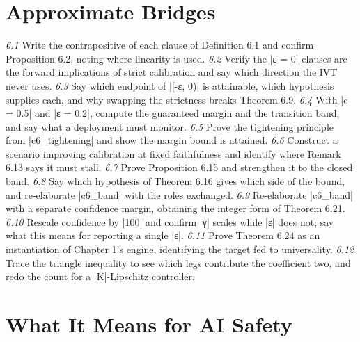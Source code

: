 \documentclass{memoir}
\begin{document}
\section{Approximate Bridges}\label{Two--Schemas--of--Impossibility-005F-005F-005F--Machine--Checked--Limits--of--Trustworthy--Machine--Learning-005F-005F-005F--and--Why--They--Tighten--with--Capability----Exercises----Approximate--Bridges}

\emph{6.1} Write the contrapositive of each clause of Definition 6.1 and confirm
Proposition 6.2, noting where linearity is used.
\emph{6.2} Verify the \LeanVerb|ε = 0| clauses are the forward implications of strict calibration and
say which direction the IVT never uses.
\emph{6.3} Say which endpoint of \LeanVerb|[-ε, 0)| is attainable, which hypothesis supplies each,
and why swapping the strictness breaks Theorem 6.9.
\emph{6.4} With \LeanVerb|c = 0.5| and \LeanVerb|ε = 0.2|, compute the guaranteed margin and the transition
band, and say what a deployment must monitor.
\emph{6.5} Prove the tightening principle from \LeanVerb|c6_tightening| and show the margin
bound is attained.
\emph{6.6} Construct a scenario improving calibration at fixed faithfulness and identify
where Remark 6.13 says it must stall.
\emph{6.7} Prove Proposition 6.15 and strengthen it to the closed band.
\emph{6.8} Say which hypothesis of Theorem 6.16 gives which side of the bound, and
re-elaborate \LeanVerb|c6_band| with the roles exchanged.
\emph{6.9} Re-elaborate \LeanVerb|c6_band| with a separate confidence margin, obtaining the
integer form of Theorem 6.21.
\emph{6.10} Rescale confidence by \LeanVerb|100| and confirm \LeanVerb|γ| scales while \LeanVerb|ε| does not; say what
this means for reporting a single \LeanVerb|ε|.
\emph{6.11} Prove Theorem 6.24 as an instantiation of Chapter 1's engine, identifying the
target fed to universality.
\emph{6.12} Trace the triangle inequality to see which legs contribute the coefficient two,
and redo the count for a \LeanVerb|K|-Lipschitz controller.



\section{What It Means for AI Safety}\label{Two--Schemas--of--Impossibility-005F-005F-005F--Machine--Checked--Limits--of--Trustworthy--Machine--Learning-005F-005F-005F--and--Why--They--Tighten--with--Capability----Exercises----What--It--Means--for--AI--Safety}
\end{document}
